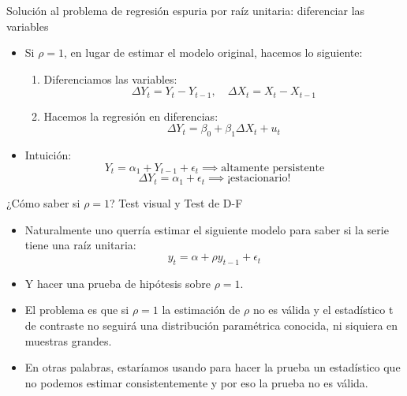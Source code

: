 \documentclass{beamer}
\begin{document}
\begin{frame}{Solución al problema de regresión espuria por raíz unitaria: diferenciar las variables}
    \begin{itemize}
        \item Si $\rho = 1$, en lugar de estimar el modelo original, hacemos lo siguiente:
        \begin{enumerate}
            \item Diferenciamos las variables:
            \[
            \Delta Y_t = Y_t - Y_{t-1}, \quad \Delta X_t = X_t - X_{t-1}
            \]
            \item Hacemos la regresión en diferencias:
            \[
            \Delta Y_t = \beta_0 + \beta_1 \Delta X_t + u_t
            \]
        \end{enumerate}
        \item Intuición:
        \[
        Y_t = \alpha_1 + Y_{t-1} + \epsilon_t \implies \text{altamente persistente}
        \]
        \[
        \Delta Y_t = \alpha_1 + \epsilon_t \implies \text{¡estacionario!}
        \]
    \end{itemize}
\end{frame}
\begin{frame}{¿Cómo saber si $\rho = 1$? Test visual y Test de D-F}
    \begin{itemize}
        \item Naturalmente uno querría estimar el siguiente modelo para saber si la serie tiene una raíz unitaria:
        \[
        y_t = \alpha + \rho y_{t-1} + \epsilon_t
        \]
        \item Y hacer una prueba de hipótesis sobre $\rho = 1$.
        \item El problema es que si $\rho = 1$ la estimación de $\rho$ no es válida y el estadístico t de contraste no seguirá una distribución paramétrica conocida, ni siquiera en muestras grandes.
        \item En otras palabras, estaríamos usando para hacer la prueba un estadístico que no podemos estimar consistentemente y por eso la prueba no es válida.
    \end{itemize}
\end{frame}
\end{document}

